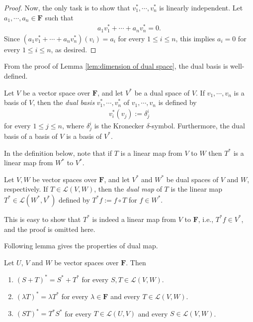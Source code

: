 \begin{subappendices}
\begin{proof}
    Now, the only task is to show that $v_1^*, \cdots, v_n^*$ is linearly independent. Let $a_1, \cdots, a_n \in \mathbf{F}$ such that
    \begin{align*}
        a_1v_1^* + \cdots + a_nv_n^* = 0.
    \end{align*}
    Since $(a_1v_1^* + \cdots + a_nv_n^*)(v_i) = a_i$ for every $1 \leq i \leq n$, this implies $a_i = 0$ for every $1 \leq i \leq n$, as desired.
\end{proof}

From the proof of Lemma \ref{lem:dimension of dual space}, the dual basis is well-defined.
\begin{definition}
    Let $V$ be a vector space over $\mathbf{F}$, and let $V^*$ be a dual space of $V$. If $v_1, \cdots, v_n$ is a basis of $V$, then the  \emph{dual basis} $v_1^*, \cdots, v_n^*$ of $v_1, \cdots, v_n$ is defined by
    \begin{align*}
        v_i^*(v_j) := \delta_j^i
    \end{align*}
    for every $1 \leq j \leq n$, where $\delta_j^i$ is the Kronecker $\delta$-symbol. Furthermore, the dual basis of a basis of $V$ is a basis of $V^*$.
\end{definition}

In the definition below, note that if $T$ is a linear map from $V$ to $W$ then $T^*$ is a linear map from $W^*$ to $V^*$.
\begin{definition}
    Let $V,W$ be vector spaces over $\mathbf{F}$, and let $V^*$ and $W^*$ be dual spaces of $V$ and $W$, respectively. If $T \in \mathcal{L}(V, W)$, then the \emph{dual map} of $T$ is the linear map $T^* \in \mathcal{L}(W^*, V^*)$ defined by $T^*f := f \circ T$ for $f \in W^*$.
\end{definition}

This is easy to show that $T^*$ is indeed a linear map from $V$ to $\mathbf{F}$, i.e., $T^*f \in V^*$, and the proof is omitted here.

Following lemma gives the properties of dual map.
\begin{lemma}
    Let $U$, $V$ and $W$ be vector spaces over $\mathbf{F}$. Then
    \begin{enumerate}
        \item $(S + T)^* = S^* + T^*$ for every $S,T \in \mathcal{L}(V, W)$.
        \item $(\lambda T)^* = \lambda T^*$ for every $\lambda \in \mathbf{F}$ and every $T \in \mathcal{L}(V, W)$.
        \item $(ST)^* = T^*S^*$ for every $T \in \mathcal{L}(U, V)$ and every $S \in \mathcal{L}(V, W)$.
    \end{enumerate}
\end{lemma}


\end{subappendices}
